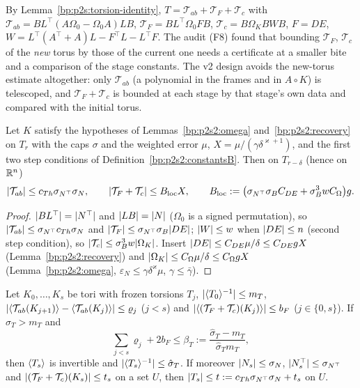 By Lemma~\ref{bp:p2s:torsion-identity}, $T=\mathcal T_{ab}+\mathcal T_F+\mathcal T_c$ with $\mathcal T_{ab}=BL^\top(A\Omega_0-\Omega_0A)LB$,
$\mathcal T_F=BL^\top\Omega_0FB$, $\mathcal T_c=B\Omega_KBWB$, $F=DE$, $W=L^\top(A^\top+A)L-F^\top L-L^\top F$. The audit (F8) found that bounding $\mathcal T_F$,
$\mathcal T_c$ of the \emph{new} torus by those of the current one needs a certificate at a smaller bite and a comparison of the stage constants.
The v2 design avoids the new-torus estimate altogether: only $\mathcal T_{ab}$ (a polynomial in the frames and in $A\circ K$) is telescoped, and
$\mathcal T_F+\mathcal T_c$ is bounded at each stage by that stage's own data and compared with the initial torus.

\begin{lemma}\label{bp:p2s2:torsion-local}
Let $K$ satisfy the hypotheses of Lemmas~\ref{bp:p2s2:omega} and~\ref{bp:p2s2:recovery} on $T_r$ with the caps $\sigma$ and the weighted error $\mu$,
$X=\mu/(\gamma\delta^{\varkappa+1})$, and the first two step conditions of Definition~\ref{bp:p2s2:constantsB}. Then on $T_{r-\delta}$ (hence on $\mathbb{R}^n$)
\[
\lvert \mathcal T_{ab}\rvert\le c_{Th}\sigma_{N^\top}\sigma_N,\qquad\lvert \mathcal T_F+\mathcal T_c\rvert\le B_{\mathrm{loc}}X,\qquad
B_{\mathrm{loc}}:=\bigl(\sigma_{N^\top}\sigma_BC_{DE}+\sigma_B^3wC_\Omega\bigr)g .
\]
\end{lemma}

\begin{proof}
\label{step:p2s2:tl}
$\lvert BL^\top\rvert=\lvert N^\top\rvert$ and $\lvert LB\rvert=\lvert N\rvert$ ($\Omega_0$ is a signed permutation), so $\lvert \mathcal T_{ab}\rvert\le\sigma_{N^\top}c_{Th}\sigma_N$ and
$\lvert \mathcal T_F\rvert\le\sigma_{N^\top}\sigma_B\lvert DE\rvert$; $\lvert W\rvert\le w$ when $\lvert DE\rvert\le n$ (second step condition), so $\lvert \mathcal T_c\rvert\le\sigma_B^3w\lvert \Omega_K\rvert$. Insert
$\lvert DE\rvert\le C_{DE}\mu/\delta\le C_{DE}gX$ (Lemma~\ref{bp:p2s2:recovery}) and $\lvert \Omega_K\rvert\le C_\Omega\mu/\delta\le C_\Omega gX$ (Lemma~\ref{bp:p2s2:omega},
$\varepsilon_N\le\gamma\delta^\varkappa\mu$, $\gamma\le\bar\gamma$).
\end{proof}

\begin{lemma}\label{bp:p2s2:torsion-ref}
Let $K_0,\dots,K_s$ be tori with frozen torsions $T_j$, $\lvert \langle T_0\rangle^{-1}\rvert\le m_T$, $\lvert \langle \mathcal T_{ab}(K_{j+1})\rangle-\langle \mathcal T_{ab}(K_j)\rangle\rvert\le\varrho_j$
($j<s$) and $\lvert \langle (\mathcal T_F+\mathcal T_c)(K_j)\rangle\rvert\le b_F$ ($j\in\{0,s\}$). If $\hat\sigma_T>m_T$ and
\[
\sum_{j<s}\varrho_j+2b_F\le\beta_T:=\frac{\hat\sigma_T-m_T}{\hat\sigma_Tm_T},
\]
then $\langle T_s\rangle$ is invertible and $\lvert \langle T_s\rangle^{-1}\rvert\le\hat\sigma_T$. If moreover $\lvert N_s\rvert\le\sigma_N$, $\lvert N_s^\top\rvert\le\sigma_{N^\top}$ and
$\lvert (\mathcal T_F+\mathcal T_c)(K_s)\rvert\le t_s$ on a set $U$, then $\lvert T_s\rvert\le t:=c_{Th}\sigma_{N^\top}\sigma_N+t_s$ on $U$.
\end{lemma}

